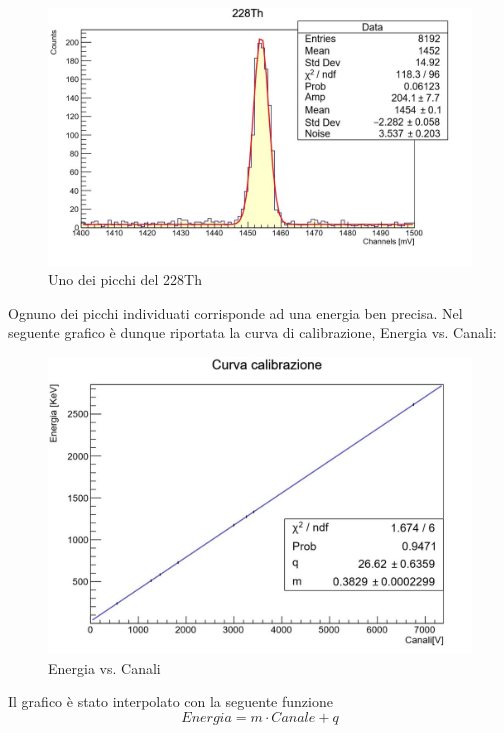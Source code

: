 \documentclass[a4paper,10pt]{article}
\begin{document}
\begin{figure}[h!]
    \centering
    \includegraphics[scale=0.45]{grafici/piccoTh}
    \caption{Uno dei picchi del 228Th}
\end{figure}

Ognuno dei picchi individuati corrisponde ad una energia ben precisa. Nel seguente grafico è dunque riportata la curva di calibrazione, Energia vs. Canali:

\begin{figure}[H]
    \centering
    \includegraphics[scale=0.45]{grafici/rettacalibrazionesources}
    \caption{Energia vs. Canali}
\end{figure}

Il grafico è stato interpolato con la seguente funzione 
\begin{equation}
	Energia=m\cdot Canale + q
\end{equation}
\end{document}
